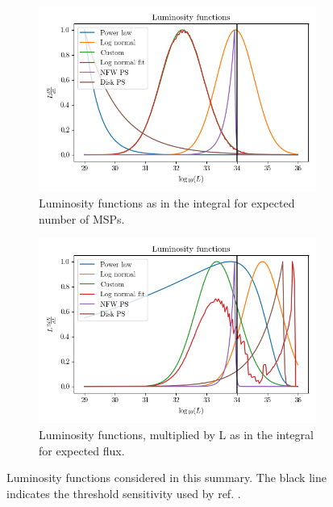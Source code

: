 \documentclass{C://Aliases//Dropbox-MIT//Latex_Templates//personal}
\begin{document}
\begin{figure}
    \centering
    \begin{subfigure}{.48\textwidth}
        \includegraphics[width=\linewidth]{figs/superimposed.png}
        \caption{Luminosity functions as in the integral for expected number of MSPs.}
    \end{subfigure}
    \hfill
    \begin{subfigure}{.48\textwidth}
        \includegraphics[width=\linewidth]{figs/superimposed-times-l.png}
        \caption{Luminosity functions, multiplied by L as in the integral for expected flux.}
    \end{subfigure}
    \caption{Luminosity functions considered in this summary. The black line indicates the threshold sensitivity used by ref. \cite{Zhong:2019ycb}.}
    \label{fig:lum-funcs}
\end{figure}
\end{document}
